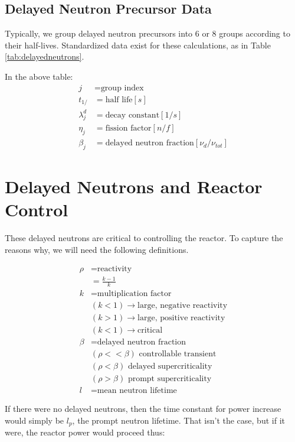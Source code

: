 \documentclass[12pt]{article}
\begin{document}
\subsection{Delayed Neutron Precursor Data}
Typically, we group delayed neutron precursors into 6 or 8 groups according to 
their half-lives. Standardized data exist for these calculations, as in Table 
\ref{tab:delayedneutrons}.



In the above table:
\begin{align}
j &= \mbox{group index}\\
t_{1/} &= \mbox{half life} [s]\\
\lambda_j^d &= \mbox{decay constant} [1/s]\\
\eta_j &= \mbox{fission factor} [n/f]\\
\beta_j &= \mbox{delayed neutron fraction} [\nu_d/\nu_{tot}]
\end{align}


\section{Delayed Neutrons and Reactor Control}
These delayed neutrons are critical to controlling the reactor. 
To capture the reasons why, we will need the following definitions.

\begin{align}
\rho &= \mbox{reactivity}\\
&= \frac{k-1}{k}\\
k &= \mbox{multiplication factor}\\
&(k < 1) \rightarrow \mbox{large, negative reactivity}\\
&(k > 1) \rightarrow \mbox{large, positive reactivity}\\
&(k < 1) \rightarrow \mbox{critical}\\
\beta &= \mbox{delayed neutron fraction}\\
&(\rho << \beta) \mbox{ controllable transient}\\
&(\rho < \beta) \mbox{ delayed supercriticality}\\
&(\rho > \beta) \mbox{ prompt supercriticality}\\
l &= \mbox{mean neutron lifetime}
\end{align}

If there were no delayed neutrons, then the time constant for power increase would simply be 
$l_p$, the prompt neutron lifetime. That isn't the case, but if it were, the 
reactor power would proceed thus:
\end{document}
